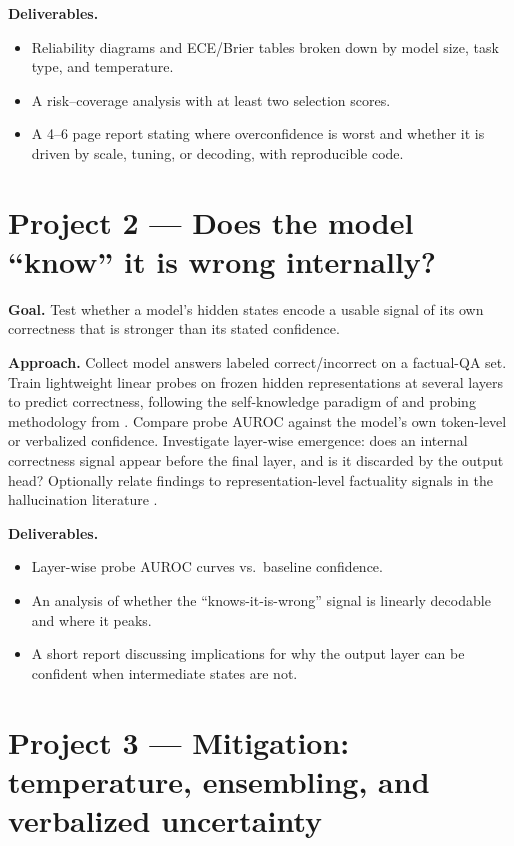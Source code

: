 \documentclass[11pt]{article}
\begin{document}
\textbf{Deliverables.}
\begin{itemize}[leftmargin=1.5em]
  \item Reliability diagrams and ECE/Brier tables broken down by model size,
  task type, and temperature.
  \item A risk--coverage analysis with at least two selection scores.
  \item A 4--6 page report stating where overconfidence is worst and whether it
  is driven by scale, tuning, or decoding, with reproducible code.
\end{itemize}

\section*{Project 2 --- Does the model ``know'' it is wrong internally?}

\textbf{Goal.} Test whether a model's hidden states encode a usable signal of
its own correctness that is stronger than its stated confidence.

\textbf{Approach.} Collect model answers labeled correct/incorrect on a
factual-QA set. Train lightweight linear probes on frozen hidden
representations at several layers to predict correctness, following the
self-knowledge paradigm of \citet{kadavath2022know} and probing methodology from
\citet{alain2017understanding}. Compare probe AUROC against the model's own
token-level or verbalized confidence. Investigate layer-wise emergence: does an
internal correctness signal appear before the final layer, and is it discarded
by the output head? Optionally relate findings to representation-level factuality
signals in the hallucination literature \citep{ji2023survey}.

\textbf{Deliverables.}
\begin{itemize}[leftmargin=1.5em]
  \item Layer-wise probe AUROC curves vs.\ baseline confidence.
  \item An analysis of whether the ``knows-it-is-wrong'' signal is linearly
  decodable and where it peaks.
  \item A short report discussing implications for why the output layer can be
  confident when intermediate states are not.
\end{itemize}

\section*{Project 3 --- Mitigation: temperature, ensembling, and verbalized uncertainty}
\end{document}
